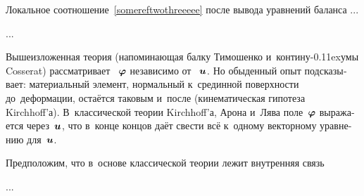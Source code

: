 

\begin{otherlanguage}{russian}

Локальное соотношение~\eqref{somereftwothreeeee} после вывода уравнений баланса ...

...



\end{otherlanguage}



\begin{otherlanguage}{russian}

Вышеизложенная теория (напоминающая балку Тимошенко и~контину\kern-0.11exумы Cosserat) рассматривает ~$\bm{\varphi}$ независимо от ~$\bm{u}$.
Но обыденный опыт подсказывает: материальный элемент, нормальный к~срединной поверхности до~деформации, остаётся таковым и~после (кинематическая гипотеза Kirchhoff’а).
В~классической теории Kirchhoff’а, Арона и~Лява поле~$\bm{\varphi}$ выражается через~$\bm{u}$, что в~конце концов даёт свести всё к~одному векторному уравнению для~$\bm{u}$.

Предположим, что в~основе классической теории лежит внутренняя связь

...



\end{otherlanguage}


